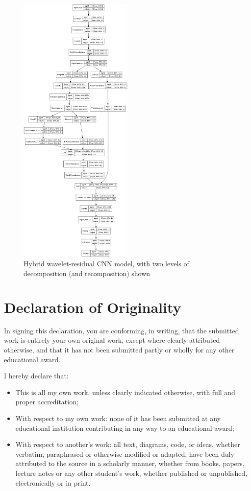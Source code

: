 \documentclass[9pt,conference]{IEEEtran}
\begin{document}
\begin{figure}
    \centering
    \includegraphics[width=0.5\textwidth]{wavelet_resid.png}
    \caption{Hybrid wavelet-residual CNN model, with two levels of decomposition (and recomposition) shown}
\end{figure}

\clearpage

\section{Declaration of Originality}

In signing this declaration, you are conforming, in writing, that the submitted work is entirely your own original work, except where clearly attributed otherwise, and that it has not been submitted partly or wholly for
any other educational award.

I hereby declare that:

\begin{itemize}
    \item This is all my own work, unless clearly indicated otherwise, with full
and proper accreditation;
    \item With respect to my own work: none of it has been submitted at any educational institution contributing in any way to an educational award;
    \item With respect to another’s work: all text, diagrams, code, or ideas, whether verbatim, paraphrased or otherwise modified or adapted, have been duly attributed to the source in a scholarly manner, whether
from books, papers, lecture notes or any other student’s work, whether published or unpublished, electronically or in print.
\end{itemize}
\end{document}
